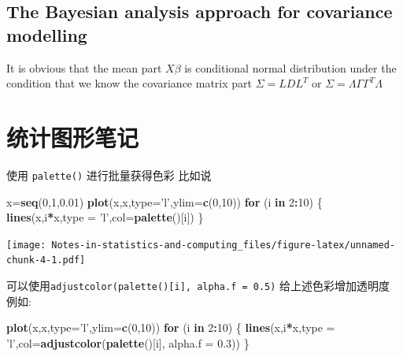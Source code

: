 \documentclass[
]{book}
\newenvironment{Shaded}{\begin{snugshade}}{\end{snugshade}}
\newcommand{\ControlFlowTok}[1]{\textcolor[rgb]{0.13,0.29,0.53}{\textbf{#1}}}
\newcommand{\DataTypeTok}[1]{\textcolor[rgb]{0.13,0.29,0.53}{#1}}
\newcommand{\DecValTok}[1]{\textcolor[rgb]{0.00,0.00,0.81}{#1}}
\newcommand{\FloatTok}[1]{\textcolor[rgb]{0.00,0.00,0.81}{#1}}
\newcommand{\KeywordTok}[1]{\textcolor[rgb]{0.13,0.29,0.53}{\textbf{#1}}}
\newcommand{\NormalTok}[1]{#1}
\newcommand{\OperatorTok}[1]{\textcolor[rgb]{0.81,0.36,0.00}{\textbf{#1}}}
\newcommand{\StringTok}[1]{\textcolor[rgb]{0.31,0.60,0.02}{#1}}
\theoremstyle{definition}
\theoremstyle{definition}
\theoremstyle{definition}
\theoremstyle{remark}
\begin{document}
\hypertarget{the-bayesian-analysis-approach-for-covariance-modelling}{%
\section{The Bayesian analysis approach for covariance modelling}\label{the-bayesian-analysis-approach-for-covariance-modelling}}

It is obvious that the mean part \(X\beta\) is conditional normal distribution under the condition that we know the covariance matrix part \(\Sigma=LDL^T\) or \(\Sigma=\Lambda\Gamma\Gamma^T\Lambda\)

\hypertarget{ux7edfux8ba1ux56feux5f62ux7b14ux8bb0}{%
\chapter{统计图形笔记}\label{ux7edfux8ba1ux56feux5f62ux7b14ux8bb0}}

使用 \texttt{palette()} 进行批量获得色彩
比如说

\begin{Shaded}
\begin{Highlighting}[]
\NormalTok{x=}\KeywordTok{seq}\NormalTok{(}\DecValTok{0}\NormalTok{,}\DecValTok{1}\NormalTok{,}\FloatTok{0.01}\NormalTok{)}
\KeywordTok{plot}\NormalTok{(x,x,}\DataTypeTok{type=}\StringTok{'l'}\NormalTok{,}\DataTypeTok{ylim=}\KeywordTok{c}\NormalTok{(}\DecValTok{0}\NormalTok{,}\DecValTok{10}\NormalTok{))}
\ControlFlowTok{for}\NormalTok{ (i }\ControlFlowTok{in} \DecValTok{2}\OperatorTok{:}\DecValTok{10}\NormalTok{) \{}
  \KeywordTok{lines}\NormalTok{(x,i}\OperatorTok{*}\NormalTok{x,}\DataTypeTok{type =} \StringTok{'l'}\NormalTok{,}\DataTypeTok{col=}\KeywordTok{palette}\NormalTok{()[i])}
\NormalTok{\}}
\end{Highlighting}
\end{Shaded}

\texttt{[image: Notes-in-statistics-and-computing\_files/figure-latex/unnamed-chunk-4-1.pdf]}

可以使用\texttt{adjustcolor(palette(){[}i{]},\ alpha.f\ =\ 0.5)} 给上述色彩增加透明度
例如:

\begin{Shaded}
\begin{Highlighting}[]
\KeywordTok{plot}\NormalTok{(x,x,}\DataTypeTok{type=}\StringTok{'l'}\NormalTok{,}\DataTypeTok{ylim=}\KeywordTok{c}\NormalTok{(}\DecValTok{0}\NormalTok{,}\DecValTok{10}\NormalTok{))}
\ControlFlowTok{for}\NormalTok{ (i }\ControlFlowTok{in} \DecValTok{2}\OperatorTok{:}\DecValTok{10}\NormalTok{) \{}
  \KeywordTok{lines}\NormalTok{(x,i}\OperatorTok{*}\NormalTok{x,}\DataTypeTok{type =} \StringTok{'l'}\NormalTok{,}\DataTypeTok{col=}\KeywordTok{adjustcolor}\NormalTok{(}\KeywordTok{palette}\NormalTok{()[i], }\DataTypeTok{alpha.f =} \FloatTok{0.3}\NormalTok{))}
\NormalTok{\}}
\end{Highlighting}
\end{Shaded}
\end{document}
